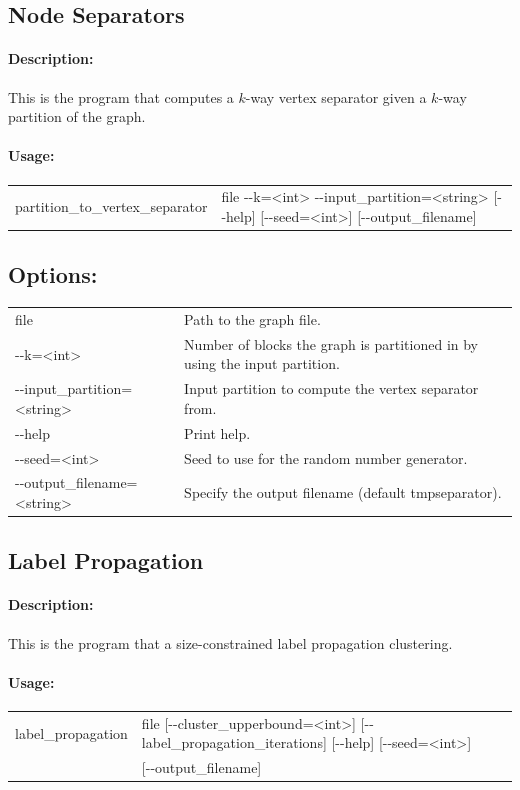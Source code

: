 \documentclass[11pt]{article}
\begin{document}
\vfill
\pagebreak
\subsection{Node Separators}
\paragraph*{Description:} This is the program that computes a $k$-way vertex separator  given a $k$-way partition of the graph.
\paragraph*{Usage:\\} 
\begin{tabular}{ll}
partition\_to\_vertex\_separator & file -{}-k=<int> -{}-input\_partition=<string> [-{}-help] [-{}-seed=<int>] [-{}-output\_filename]
\end{tabular}
\subsection*{Options:\\} 
\begin{tabularx}{\textwidth}{lX}
  file                       & Path to the graph file. \\
  -{}-k=<int>                  & Number of blocks the graph is partitioned in by using the input partition. \\
  -{}-input\_partition=<string>& Input partition to compute the vertex separator from. \\
  -{}-help                     & Print help. \\
  -{}-seed=<int>               & Seed to use for the random number generator. \\
  -{}-output\_filename=<string>               & Specify the output filename (default tmpseparator). \\
\end{tabularx}
\subsection{Label Propagation}
\paragraph*{Description:} This is the program that a size-constrained label propagation clustering.
\paragraph*{Usage:\\} 
\begin{tabular}{ll}
label\_propagation & file [-{}-cluster\_upperbound=<int>] [-{}-label\_propagation\_iterations] [-{}-help] [-{}-seed=<int>]\\
               & [-{}-output\_filename]
\end{tabular}
\end{document}
